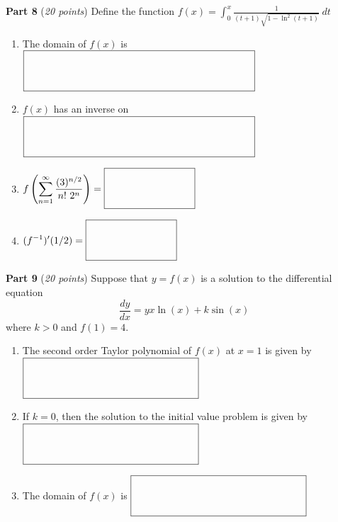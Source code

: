 \documentclass[12pt]{article}
\begin{document}
\newpage

\textbf{Part 8} (\textit{20 points}) Define the function $\displaystyle f(x)=\int_{0}^{x}\frac{1}{(t+1)\sqrt{1-\ln^{2}(t+1)}}\ dt$

\begin{enumerate}[label=\textbf{Q\arabic*}]
    \item The domain of $\displaystyle f(x)$ is $\fbox{\raisebox{-0.4\height}{\makebox[8cm]{\rule{0pt}{8ex}}}}$
    \vspace{4cm}
    \item $f(x)$ has an inverse on $\fbox{\raisebox{-0.4\height}{\makebox[8cm]{\rule{0pt}{8ex}}}}$
    \vspace{3cm}
    \item $\displaystyle f\left(\sum_{n=1}^{\infty}\frac{(3)^{n/2}}{n! \ 2^{n}}\right)=\fbox{\raisebox{-0.4\height}{\makebox[3cm]{\rule{0pt}{8ex}}}}$
    \vspace{3.5cm}
    \item $\displaystyle (f^{-1})'(1/2)=\fbox{\raisebox{-0.4\height}{\makebox[3cm]{\rule{0pt}{8ex}}}}$
\end{enumerate}

\newpage

\textbf{Part 9} (\textit{20 points}) Suppose that $y=f(x)$ is a solution to the differential equation 
\[
    \displaystyle \frac{dy}{dx}=yx\ln(x)+k\sin(x)
\]
where $k>0$ and $f(1)=4$. 
\begin{enumerate}[label=\textbf{Q\arabic*}]
    \item The second order Taylor polynomial of $f(x)$ at $x=1$ is given by $\fbox{\raisebox{-0.4\height}{\makebox[6cm]{\rule{0pt}{8ex}}}}$  
    \vspace{5cm}
    \item If $k=0$, then the solution to the initial value problem is given by $\fbox{\raisebox{-0.4\height}{\makebox[6cm]{\rule{0pt}{8ex}}}}$
    \vspace{6cm}
    \item The domain of $f(x)$ is $\fbox{\raisebox{-0.4\height}{\makebox[6cm]{\rule{0pt}{8ex}}}}$
\end{enumerate}

\newpage
\end{document}
